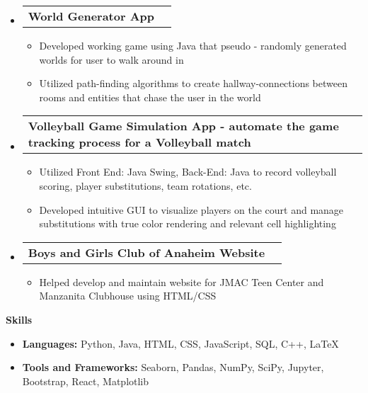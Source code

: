 \documentclass[letterpaper,8pt]{article}[leftmargin=*]
\makeatletter
\renewcommand{\section}[2]{\vspace{2pt}
  \colorbox{secondary}{\color{white}\raggedbottom\normalsize\textbf{{#1}{\hspace{7pt}#2}}}
}
\newcommand{\resumeEntryStart}{\begin{itemize}[leftmargin=2.5mm]}
\newcommand{\resumeEntryEnd}{\end{itemize}\vspace{0pt}}
\newcommand{\resumeItemListStart}{\begin{itemize}[leftmargin=4.5mm]}
\newcommand{\resumeItemListEnd}{\end{itemize} \vspace{0pt}}
\newcommand{\resumeItem}[1]{
  \item\small{
    {#1 \vspace{-3pt}}
  }
}
\newcommand{\resumeEntryTD}[2]{
  \vspace{-1pt}\item[]
    \begin{tabularx}{0.97\textwidth}{X@{\hspace{60pt}}r}
      \textbf{\color{primary}#1} & {\firabook\color{accent}\small#2} \\
    \end{tabularx}\vspace{-5pt}
}
\newcommand{\resumeEntryS}[2]{
  \item[]\small{
    \textbf{\color{primary}#1 }{ #2 \vspace{-8pt}}
  }
}
\makeatother
\begin{document}
  \resumeEntryStart
    \resumeEntryTD
      {World Generator App}{}
    \resumeItemListStart
      \resumeItem {Developed working game using Java that pseudo - randomly generated worlds for user to walk around in}
      \resumeItem {Utilized path-finding algorithms to create hallway-connections between rooms and entities that chase the user in the world}
    \resumeItemListEnd
  \resumeEntryEnd

  \resumeEntryStart
    \resumeEntryTD
      {Volleyball Game Simulation App - automate the game tracking process for a Volleyball match}{}
    \resumeItemListStart
      \resumeItem {Utilized Front End: Java Swing, Back-End: Java to record volleyball scoring, player substitutions, team rotations, etc.}
      \resumeItem {Developed intuitive GUI to visualize players on the court and manage substitutions with true color rendering and relevant cell highlighting}
    \resumeItemListEnd
  \resumeEntryEnd

  \resumeEntryStart
    \resumeEntryTD
      {Boys and Girls Club of Anaheim Website}{}
    \resumeItemListStart
      \resumeItem {Helped develop and maintain website for JMAC Teen Center and Manzanita Clubhouse using HTML/CSS}
    \resumeItemListEnd
  \resumeEntryEnd

\section{\faGears}{Skills}
 \resumeEntryStart
  \resumeEntryS{Languages: } {Python, Java, HTML, CSS, JavaScript, SQL, C++, LaTeX}
  \resumeEntryS{Tools and Frameworks: } { Seaborn, Pandas, NumPy, SciPy, Jupyter, Bootstrap, React, Matplotlib}
 \resumeEntryEnd
\end{document}
